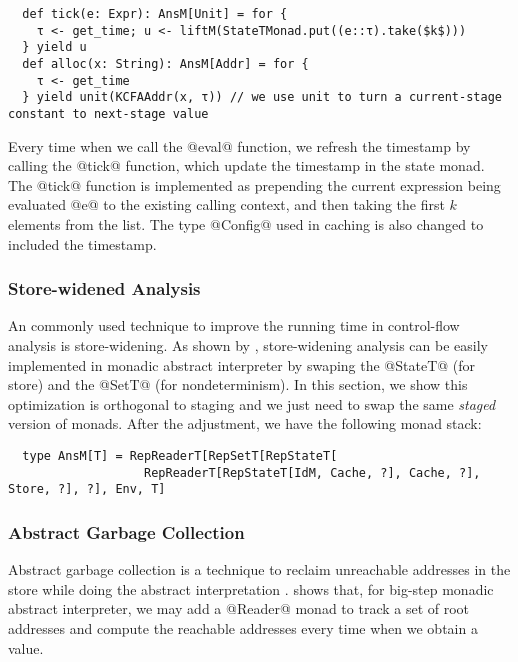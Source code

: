 \begin{lstlisting}
  def tick(e: Expr): AnsM[Unit] = for {
    τ <- get_time; u <- liftM(StateTMonad.put((e::τ).take($k$)))
  } yield u
  def alloc(x: String): AnsM[Addr] = for {
    τ <- get_time
  } yield unit(KCFAAddr(x, τ)) // we use unit to turn a current-stage constant to next-stage value
\end{lstlisting}

Every time when we call the @eval@ function, we refresh the timestamp by calling
the @tick@ function, which update the timestamp in the state monad. The @tick@
function is implemented as prepending the current expression being evaluated @e@
to the existing calling context, and then taking the first $k$ elements from the list.
The type @Config@ used in caching is also changed to included the timestamp.

\subsubsection{Store-widened Analysis}

An commonly used technique to improve the running time in control-flow analysis
is store-widening. As shown by \cite{Darais:2015:GTM:2814270.2814308,
DBLP:journals/pacmpl/DaraisLNH17}, store-widening analysis can be easily
implemented in monadic abstract interpreter by swaping the @StateT@ (for store)
and the @SetT@ (for nondeterminism). In this section, we show this optimization
is orthogonal to staging and we just need to swap the same \textit{staged}
version of monads. After the adjustment, we have the following monad stack:

\begin{lstlisting}
  type AnsM[T] = RepReaderT[RepSetT[RepStateT[
                   RepReaderT[RepStateT[IdM, Cache, ?], Cache, ?], Store, ?], ?], Env, T]
\end{lstlisting}

\subsubsection{Abstract Garbage Collection}

Abstract garbage collection is a technique to reclaim unreachable addresses in
the store while doing the abstract interpretation
\cite{Might:2006:IFA:1159803.1159807}. \citet{DBLP:journals/pacmpl/DaraisLNH17}
shows that, for big-step monadic abstract interpreter, we may add a @Reader@
monad to track a set of root addresses and compute the reachable addresses every
time when we obtain a value.

